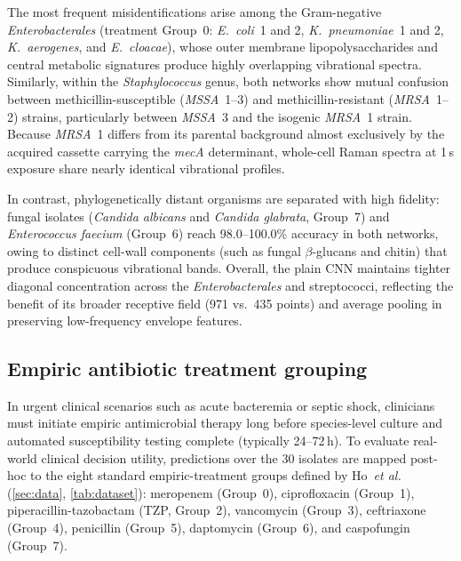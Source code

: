 \documentclass[journal,onecolumn]{IEEEtran}
\newcommand{\sunit}[1]{#1\,s}             %
\begin{document}
The most frequent misidentifications arise among the Gram-negative
\textit{Enterobacterales} (treatment Group~0: \textit{E.~coli}~1 and 2,
\textit{K.~pneumoniae}~1 and 2, \textit{K.~aerogenes}, and
\textit{E.~cloacae}), whose outer membrane lipopolysaccharides and central
metabolic signatures produce highly overlapping vibrational spectra. Similarly,
within the \textit{Staphylococcus} genus, both networks show mutual confusion
between methicillin-susceptible (\textit{MSSA}~1--3) and methicillin-resistant
(\textit{MRSA}~1--2) strains, particularly between \textit{MSSA}~3 and the
isogenic \textit{MRSA}~1 strain. Because \textit{MRSA}~1 differs from its
parental background almost exclusively by the acquired cassette carrying the
\textit{mecA} determinant, whole-cell Raman spectra at \sunit{1} exposure
share nearly identical vibrational profiles.

In contrast, phylogenetically distant organisms are separated with high
fidelity: fungal isolates (\textit{Candida albicans} and \textit{Candida glabrata},
Group~7) and \textit{Enterococcus faecium} (Group~6) reach 98.0--100.0\%
accuracy in both networks, owing to distinct cell-wall components (such as fungal
$\beta$-glucans and chitin) that produce conspicuous vibrational bands. Overall,
the plain CNN maintains tighter diagonal concentration across the
\textit{Enterobacterales} and streptococci, reflecting the benefit of its
broader receptive field (971 vs.\ 435 points) and average pooling in preserving
low-frequency envelope features.

\subsection{Empiric antibiotic treatment grouping}
\label{sec:res-treatment}
In urgent clinical scenarios such as acute bacteremia or septic shock,
clinicians must initiate empiric antimicrobial therapy long before species-level
culture and automated susceptibility testing complete (typically 24--72\,h).
To evaluate real-world clinical decision utility, predictions over the
30 isolates are mapped post-hoc to the eight standard empiric-treatment
groups defined by Ho~\textit{et al.}~\cite{ho2019rapid}
(\cref{sec:data}, \cref{tab:dataset}):
meropenem (Group~0), ciprofloxacin (Group~1), piperacillin-tazobactam (TZP,
Group~2), vancomycin (Group~3), ceftriaxone (Group~4), penicillin (Group~5),
daptomycin (Group~6), and caspofungin (Group~7).
\end{document}
